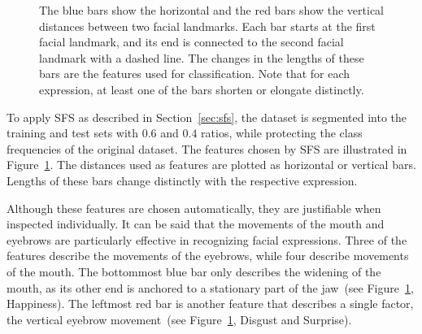 \documentclass[hyperfootnotes=false]{article}
\begin{document}
\begin{figure}
	\caption{
		The blue bars show the horizontal and the red bars show the vertical distances between two facial landmarks.
		Each bar starts at the first facial landmark, and its end is connected to the second facial landmark with a dashed line.
		The changes in the lengths of these bars are the features used for classification.
		Note that for each expression, at least one of the bars shorten or elongate distinctly.}
	\label{fig:Features}
	\vspace{3mm}
\end{figure}

To apply SFS as described in Section~\ref{sec:sfs}, the dataset is segmented into the training and test sets with $0.6$ and $0.4$ ratios, while protecting the class frequencies of the original dataset.
The features chosen by SFS are illustrated in Figure~\ref{fig:Features}.
The distances used as features are plotted as horizontal or vertical bars.
Lengths of these bars change distinctly with the respective expression.

Although these features are chosen automatically, they are justifiable when inspected individually.
It can be said that the movements of the mouth and eyebrows are particularly effective in recognizing facial expressions.
Three of the features describe the movements of the eyebrows, while four describe movements of the mouth.
The bottommost blue bar only describes the widening of the mouth, as its other end is anchored to a stationary part of the jaw~(see Figure~\ref{fig:Features}, Happiness).
The leftmost red bar is another feature that describes a single factor, the vertical eyebrow movement~(see Figure~\ref{fig:Features}, Disgust and Surprise).
\end{document}
